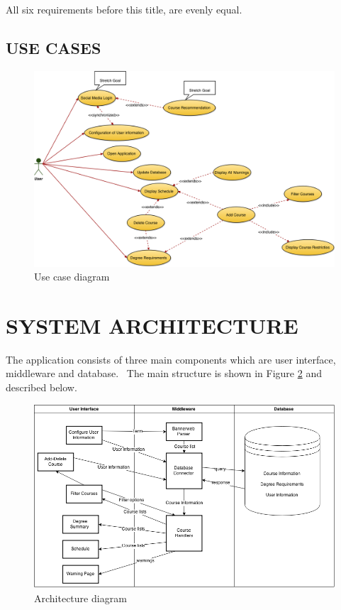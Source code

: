\documentclass[twoside,letterpaper]{article}
\begin{document}
{\color{black}
All six requirements before this title, are evenly equal.}

\subsection[USE CASES]{\rmfamily\bfseries\color{black}
USE CASES}

\begin{figure}[h]
\centering
\includegraphics[width=\linewidth]{usecasediagram.png}
\caption{Use case diagram}
\label{fig:usecase_diagram}
\end{figure}

\clearpage\section[SYSTEM ARCHITECTURE]{\rmfamily\bfseries\color{black}
SYSTEM ARCHITECTURE}

{\color{black}
The application consists of three main components which are user interface, middleware and database. \ The main structure is shown in Figure \ref{fig:architecture_diagram} and described below.}

\begin{figure}[h]
\centering
\includegraphics[width=\linewidth]{architecturediagram.png}
\caption{Architecture diagram}
\label{fig:architecture_diagram}
\end{figure}
\end{document}
